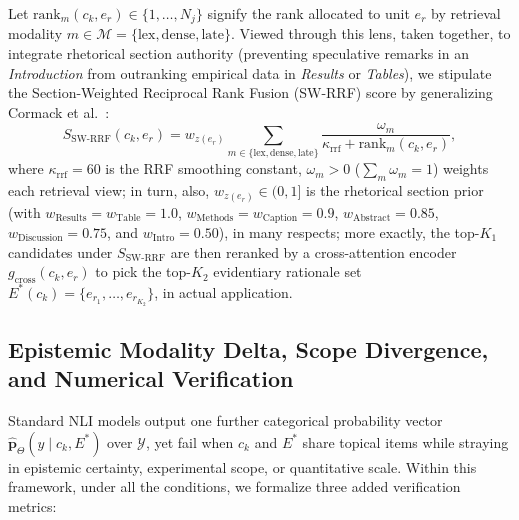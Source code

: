 \documentclass[sigconf]{acmart}
\begin{document}
Let $\text{rank}_m(c_k, e_r) \in \{1, \dots, N_j\}$ signify the rank allocated to unit $e_r$ by retrieval modality $m \in \mathcal{M} = \{\text{lex}, \text{dense}, \text{late}\}$. Viewed through this lens, taken together, to integrate rhetorical section authority (preventing speculative remarks in an \emph{Introduction} from outranking empirical data in \emph{Results} or \emph{Tables}), we stipulate the Section-Weighted Reciprocal Rank Fusion (SW-RRF) score by generalizing Cormack et al.\ \cite{cormack2009reciprocal}:
\begin{equation}
S_{\text{SW-RRF}}(c_k, e_r) = w_{z(e_r)} \sum_{m \in \{\text{lex}, \text{dense}, \text{late}\}} \frac{\omega_m}{\kappa_{\text{rrf}} + \text{rank}_m(c_k, e_r)},
\label{eq:sw_rrf}
\end{equation}
where $\kappa_{\text{rrf}} = 60$ is the RRF smoothing constant, $\omega_m > 0$ ($\sum_m \omega_m = 1$) weights each retrieval view; in turn, also, $w_{z(e_r)} \in (0, 1]$ is the rhetorical section prior (with $w_{\text{Results}} = w_{\text{Table}} = 1.0$, $w_{\text{Methods}} = w_{\text{Caption}} = 0.9$, $w_{\text{Abstract}} = 0.85$, $w_{\text{Discussion}} = 0.75$, and $w_{\text{Intro}} = 0.50$), in many respects; more exactly, the top-$K_1$ candidates under $S_{\text{SW-RRF}}$ are then reranked by a cross-attention encoder $g_{\text{cross}}(c_k, e_r)$ to pick the top-$K_2$ evidentiary rationale set $E^*(c_k) = \{e_{r_1}, \dots, e_{r_{K_2}}\}$, in actual application.

\subsection{Epistemic Modality Delta, Scope Divergence, and Numerical Verification}
Standard NLI models output one further categorical probability vector $\hat{\mathbf{p}}_{\Theta}(y \mid c_k, E^*)$ over $\mathcal{Y}$, yet fail when $c_k$ and $E^*$ share topical items while straying in epistemic certainty, experimental scope, or quantitative scale. Within this framework, under all the conditions, we formalize three added verification metrics:
\end{document}
